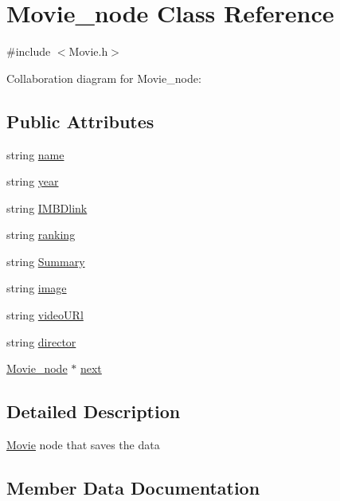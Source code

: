 \hypertarget{classMovie__node}{}\section{Movie\+\_\+node Class Reference}
\label{classMovie__node}


{\ttfamily \#include $<$Movie.\+h$>$}



Collaboration diagram for Movie\+\_\+node\+:
\subsection*{Public Attributes}
\begin{DoxyCompactItemize}
\item 
string \hyperlink{classMovie__node_a236fd675c12c3fb8c2f19b9468c42b8d}{name}
\item 
string \hyperlink{classMovie__node_a0dd5efdccfdad17e92ec23f407d939c4}{year}
\item 
string \hyperlink{classMovie__node_afcd448d939f523e8bc80ebaa810d75a0}{I\+M\+B\+Dlink}
\item 
string \hyperlink{classMovie__node_a2aea339243aca3a9a58cb7354b77843f}{ranking}
\item 
string \hyperlink{classMovie__node_a8371338af1be6c6f6d39999f69f0f919}{Summary}
\item 
string \hyperlink{classMovie__node_a643cb2b9df71d9aee01eedb5d79ecd8c}{image}
\item 
string \hyperlink{classMovie__node_a7a230db668bcc7c4a33af83d49b31e7f}{video\+U\+Rl}
\item 
string \hyperlink{classMovie__node_af49c3a44105bbe13155be7eab6839005}{director}
\item 
\hyperlink{classMovie__node}{Movie\+\_\+node} $\ast$ \hyperlink{classMovie__node_a75a123d602ef3727215a1fe208bffc63}{next}
\end{DoxyCompactItemize}


\subsection{Detailed Description}
\hyperlink{classMovie}{Movie} node that saves the data 

\subsection{Member Data Documentation}
\mbox{\label{classMovie__node_af49c3a44105bbe13155be7eab6839005}} 
